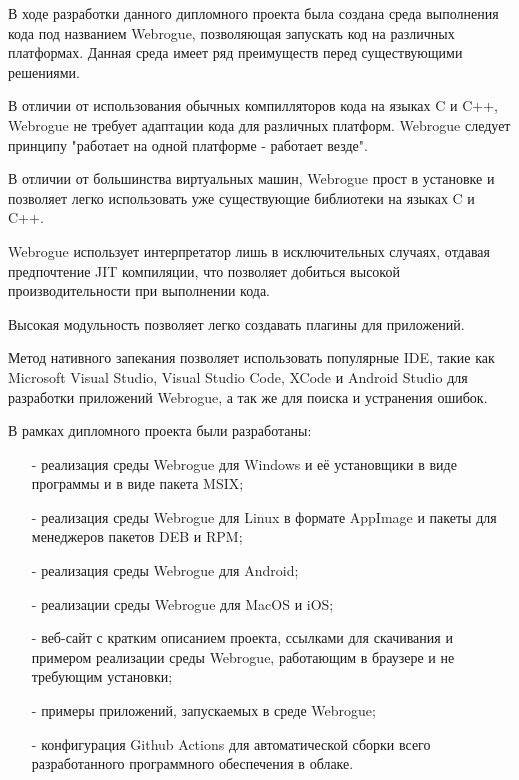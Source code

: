 В ходе разработки данного дипломного проекта была создана среда выполнения кода под названием Webrogue, позволяющая запускать код на различных платформах.
Данная среда имеет ряд преимуществ перед существующими решениями.

В отличии от использования обычных компилляторов кода на языках C и C++, Webrogue не требует адаптации кода для различных платформ. 
Webrogue следует принципу "работает на одной платформе - работает везде".

В отличии от большинства виртуальных машин, Webrogue прост в установке и позволяет легко использовать уже существующие библиотеки на языках C и C++.

Webrogue использует интерпретатор лишь в исключительных случаях, отдавая предпочтение JIT компиляции, что позволяет добиться высокой производительности при выполнении кода.

Высокая модульность позволяет легко создавать плагины для приложений.

Метод нативного запекания позволяет использовать популярные IDE, такие как Microsoft Visual Studio, Visual Studio Code, XCode и Android Studio для разработки приложений Webrogue, а так же для поиска и устранения ошибок.

В рамках дипломного проекта были разработаны:
\begin{itemize}
    \item[-] реализация среды Webrogue для Windows и её установщики в виде программы и в виде пакета MSIX;
    \item[-] реализация среды Webrogue для Linux в формате AppImage и пакеты для менеджеров пакетов DEB и RPM;
    \item[-] реализация среды Webrogue для Android;
    \item[-] реализации среды Webrogue для MacOS и iOS;
    \item[-] веб-сайт с кратким описанием проекта, ссылками для скачивания и примером реализации среды Webrogue, работающим в браузере и не требующим установки;
    \item[-] примеры приложений, запускаемых в среде Webrogue;
    \item[-] конфигурация Github Actions для автоматической сборки всего разработанного программного обеспечения в облаке.
\end{itemize}

